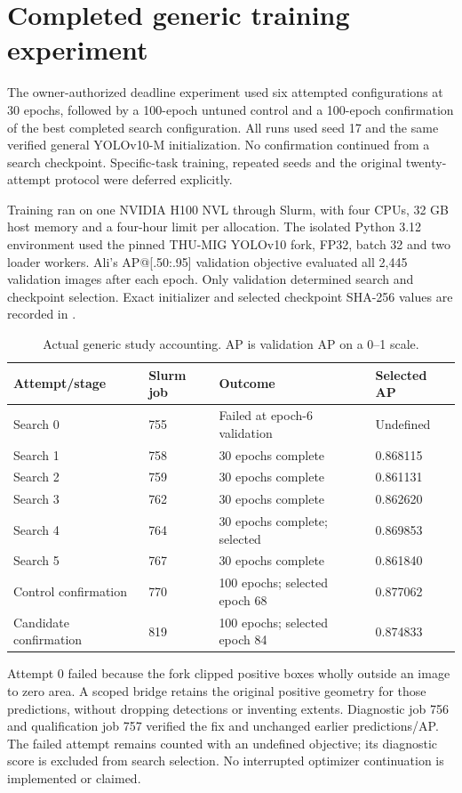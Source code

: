 \section{Completed generic training experiment}
\label{sec:t41-results}
The owner-authorized deadline experiment used six attempted configurations at
30 epochs, followed by a 100-epoch untuned control and a 100-epoch confirmation
of the best completed search configuration. All runs used seed 17 and the same
verified general YOLOv10-M initialization. No confirmation continued from a
search checkpoint. Specific-task training, repeated seeds and the original
twenty-attempt protocol were deferred explicitly.

Training ran on one NVIDIA H100 NVL through Slurm, with four CPUs, 32 GB host
memory and a four-hour limit per allocation. The isolated Python 3.12 environment
used the pinned THU-MIG YOLOv10 fork, FP32, batch 32 and two loader workers.
Ali's AP@[.50:.95] validation objective evaluated all 2,445 validation images
after each epoch. Only validation determined search and checkpoint selection.
Exact initializer and selected checkpoint SHA-256 values are recorded in
.

\begin{table}[htbp]\centering\small
\caption{Actual generic study accounting. AP is validation AP on a 0--1 scale.}
\label{tab:t41-search}
\begin{tabular}{llll}
\toprule Attempt/stage & Slurm job & Outcome & Selected AP\\\midrule
Search 0 & 755 & Failed at epoch-6 validation & Undefined\\
Search 1 & 758 & 30 epochs complete & 0.868115\\
Search 2 & 759 & 30 epochs complete & 0.861131\\
Search 3 & 762 & 30 epochs complete & 0.862620\\
Search 4 & 764 & 30 epochs complete; selected & 0.869853\\
Search 5 & 767 & 30 epochs complete & 0.861840\\
Control confirmation & 770 & 100 epochs; selected epoch 68 & 0.877062\\
Candidate confirmation & 819 & 100 epochs; selected epoch 84 & 0.874833\\
\bottomrule
\end{tabular}
\end{table}

Attempt 0 failed because the fork clipped positive boxes wholly outside an image
to zero area. A scoped bridge retains the original positive geometry for those
predictions, without dropping detections or inventing extents. Diagnostic job 756
and qualification job 757 verified the fix and unchanged earlier predictions/AP.
The failed attempt remains counted with an undefined objective; its diagnostic
score is excluded from search selection. No interrupted optimizer continuation
is implemented or claimed.

